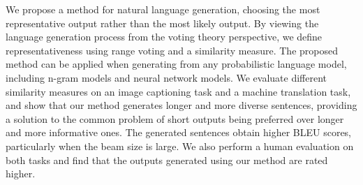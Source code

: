 We propose a method for natural language generation, choosing the most representative output rather than the most likely output. By viewing the language generation process from the voting theory perspective, we define representativeness using range voting and a similarity measure. The proposed method can be applied when generating from any probabilistic language model, including n-gram models and neural network models. We evaluate different similarity measures on an image captioning task and a machine translation task, and show that our method generates longer and more diverse sentences, providing a solution to the common problem of short outputs being preferred over longer and more informative ones. The generated sentences obtain higher BLEU scores, particularly when the beam size is large. We also perform a human evaluation on both tasks and find that the outputs generated using our method are rated higher.
